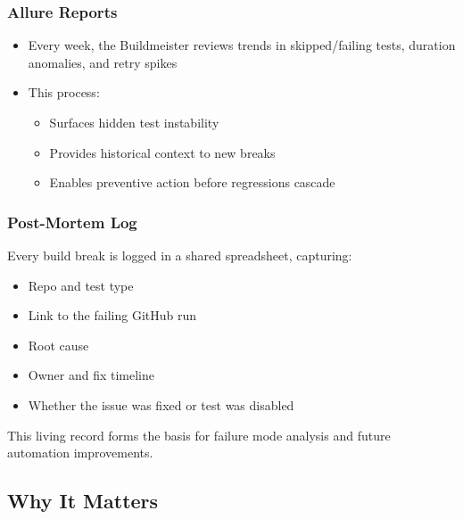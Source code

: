 \documentclass{article}
\begin{document}
\subsubsection{Allure Reports}
\label{allure-reports}

\begin{itemize}

  \item Every week, the Buildmeister reviews trends in skipped/failing tests, duration
    anomalies, and retry spikes

  \item This process:

    \begin{itemize}

      \item Surfaces hidden test instability

      \item Provides historical context to new breaks

      \item Enables preventive action before regressions cascade
    \end{itemize}
\end{itemize}

\subsubsection{Post-Mortem Log}
\label{post-mortem-log}

Every build break is logged in a shared spreadsheet, capturing:

\begin{itemize}

  \item Repo and test type

  \item Link to the failing GitHub run

  \item Root cause

  \item Owner and fix timeline

  \item Whether the issue was fixed or test was disabled
\end{itemize}

This living record forms the basis for failure mode analysis and future automation
improvements.

\subsection{Why It Matters}
\label{why-it-matters}
\end{document}
